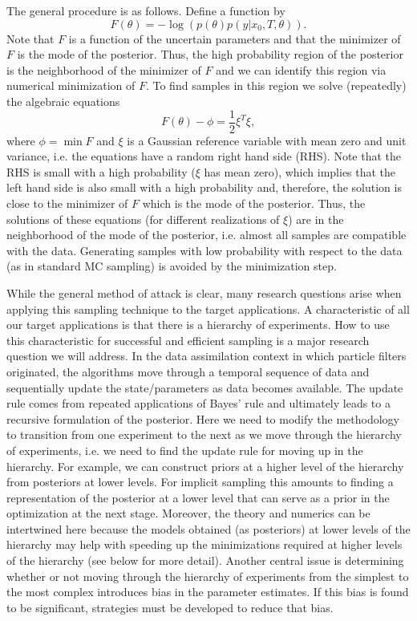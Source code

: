 \documentclass[11pt]{article}
\begin{document}
The general procedure is as follows. Define a function by
\begin{equation}
	F(\theta)= -\log \left(p(\theta)p(y|x_0,T,\theta)\right).
\end{equation}
Note that $F$ is a function of the uncertain parameters and that the minimizer of $F$ is the mode of the posterior. Thus, the high probability region of the posterior is the neighborhood of the minimizer of $F$ and we can identify this region via numerical minimization of $F$. To find samples in this region we solve (repeatedly) the algebraic equations
\begin{equation}
\label{eq:IS_sampling_eq}
	F(\theta)-\phi = \frac{1}{2}\xi^T\xi,
\end{equation}
where $\phi = \min F$ and $\xi$ is a Gaussian reference variable with mean zero and unit variance, i.e. the equations have a random right hand side (RHS). Note that the RHS is small with a high probability ($\xi$ has mean zero), which implies that the left hand side is also small with a high probability and, therefore, the solution is close to the minimizer of $F$ which is the mode of the posterior. Thus, the solutions of these equations (for different realizations of $\xi$) are in the neighborhood of the mode of the posterior, i.e. almost all samples are compatible with the data. Generating samples with low probability with respect to the data (as in standard MC sampling) is avoided by the minimization step. 

While the general method of attack is clear, many research questions arise when applying this sampling technique to the target applications. A characteristic of all our target applications is that there is a hierarchy of experiments. How to use this characteristic for successful and efficient sampling is a major research question we will address. In the data assimilation context in which particle filters originated, the algorithms move through a temporal sequence of data and sequentially update the state/parameters as data becomes available. The update rule comes from repeated applications of Bayes' rule and ultimately leads to a recursive formulation of the posterior. Here we need to modify the methodology to transition from one experiment to the next as we move through the hierarchy of experiments, i.e. we need to find the update rule for moving up in the hierarchy. For example, we can construct priors at a higher level of the hierarchy from posteriors at lower levels. For implicit sampling this amounts to finding a representation of the posterior at a lower level that can serve as a prior in the optimization at the next stage. Moreover, the theory and numerics can be intertwined here because the models obtained (as posteriors) at lower levels of the hierarchy may help with speeding up the minimizations required at higher levels of the hierarchy (see below for more detail).  Another central issue is determining whether or not moving through the hierarchy of experiments from the simplest to the most complex introduces bias in the parameter estimates. If this bias is found to be significant, strategies must be developed to reduce that bias. 
\end{document}
